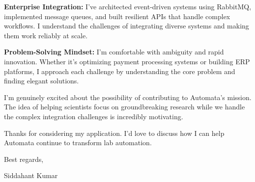 \documentclass[letterpaper,10pt]{article}
\begin{document}
\textbf{Enterprise Integration:} I've architected event-driven systems using RabbitMQ, implemented message queues, and built resilient APIs that handle complex workflows. I understand the challenges of integrating diverse systems and making them work reliably at scale.

\textbf{Problem-Solving Mindset:} I'm comfortable with ambiguity and rapid innovation. Whether it's optimizing payment processing systems or building ERP platforms, I approach each challenge by understanding the core problem and finding elegant solutions.

\vspace{10pt}

I'm genuinely excited about the possibility of contributing to Automata's mission. The idea of helping scientists focus on groundbreaking research while we handle the complex integration challenges is incredibly motivating.

Thanks for considering my application. I'd love to discuss how I can help Automata continue to transform lab automation.

Best regards,

Siddahant Kumar
\end{document}
